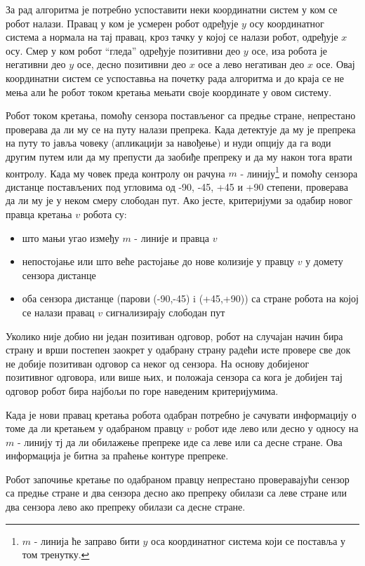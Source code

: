 \documentclass[12pt,oneside]{memoir}
\theoremstyle{remark}
\begin{document}
За рад алгоритма је потребно успоставити неки координатни систем у ком се робот налази. Правац у ком је усмерен робот одређује $y$ осу координатног система а нормала на тај правац, кроз тачку у којој се налази робот, одређује $x$ осу. Смер у ком робот ``гледа'' одређује позитивни део $y$ осе, иза робота је негативни део $y$ осе, десно позитивни део $x$ осе а лево негативан део $x$ осе. Овај координатни систем се успоставња на почетку рада алгоритма и до краја се не мења али ће робот током кретања мењати своје координате у овом систему.

Робот током кретања, помоћу сензора постављеног са предње стране, непрестано проверава да ли му се на путу налази препрека. Када детектује да му је препрека на путу то јавља човеку (апликацији за навођење) и нуди опцију да га води другим путем или да му препусти да заобиђе препреку и да му након тога врати контролу. Када му човек преда контролу он рачуна $m$ - линију\footnote{$m$ - линија ће заправо бити $y$ оса координатног система који се поставља у том тренутку.} и помоћу сензора дистанце постављених под угловима од -90, -45, +45 и +90 степени, проверава да ли му је у неком смеру слободан пут. Ако јесте, критеријуми за одабир новог правца кретања $v$ робота су:
\begin{itemize}
\item што мањи угао између $m$ - линије и правца $v$
\item непостојање или што веће растојање до нове колизије у правцу $v$ у домету сензора дистанце
\item оба сензора дистанце (парови (-90,-45) i (+45,+90)) са стране робота на којој се налази правац $v$  сигнализирају слободан пут
\end{itemize}

Уколико није добио ни један позитиван одговор, робот на случајан начин бира страну и врши постепен заокрет у одабрану страну радећи исте провере све док не добије позитиван одговор са неког од сензора. На основу добијеног позитивног одговора, или више њих, и положаја сензора са кога је добијен тај одговор робот бира најбољи по горе наведеним критеријумима.

Када је нови правац кретања робота одабран потребно је сачувати информацију о томе да ли кретањем у одабраном правцу $v$ робот иде лево или десно у односу на $m$ - линију тј да ли обилажење препреке иде са леве или са десне стране. Ова информација је битна за праћење контуре препреке.

Робот започиње кретање по одабраном правцу непрестано проверавајући сензор са предње стране и два сензора десно ако препреку обилази са леве стране или два сензора лево ако препреку обилази са десне стране. 
\end{document}
